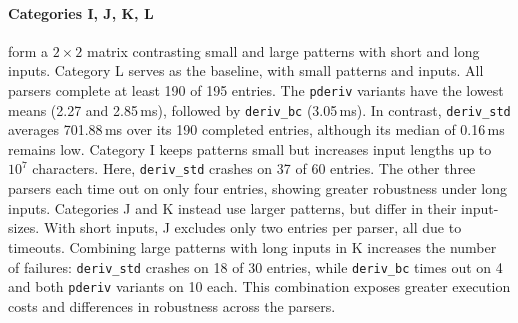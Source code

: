 \paragraph{Categories I, J, K, L}
form a $2\times2$ matrix contrasting small and large
patterns with short and long inputs.
Category L serves as the baseline, with small patterns
and inputs. All parsers complete at least 190 of 195 entries.
The \texttt{pderiv} variants have the lowest means
(2.27 and 2.85\,ms), followed by \texttt{deriv\_bc}
(3.05\,ms). In contrast, \texttt{deriv\_std}
averages 701.88\,ms over its 190 completed entries,
although its median of 0.16\,ms remains low.
Category I keeps patterns small but increases input lengths
up to $10^7$ characters.
Here, \texttt{deriv\_std} crashes on 37 of 60 entries.
The other three parsers each time out on only four entries,
showing greater robustness under long inputs.
Categories J and K instead use larger patterns,
but differ in their input-sizes.
With short inputs, J excludes only two entries per parser,
all due to timeouts.
Combining large patterns with long inputs in K
increases the number of failures:
\texttt{deriv\_std} crashes on 18 of 30 entries,
while \texttt{deriv\_bc} times out on 4
and both \texttt{pderiv} variants on 10 each.
This combination exposes greater execution costs
and differences in robustness across the parsers.

